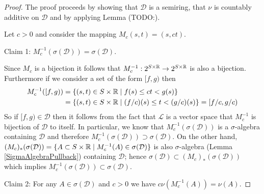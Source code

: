 \documentclass{amsart}
\theoremstyle{remark}
\theoremstyle{definition}
\begin{document}
\begin{proof}
The proof proceeds by showing that $\mathcal{D}$ is a semiring, that
$\nu$ is countably additive on $\mathcal{D}$ and by applying Lemma (TODO:).

Let $c > 0$ and consider the mapping $M_c(s,t) = (s, ct)$.  

Claim 1: $M_c^{-1}(\sigma(\mathcal{D})) = \sigma(\mathcal{D})$.

Since $M_c$ is a bijection it follows that $M_c^{-1} : 2^{S \times \mathbb{R}}
\to 2^{S \times \mathbb{R}}$ is also a bijection.  Furthermore if we
consider a set of the form $[f,g)$ then 
\begin{align*}
M_c^{-1}([f,g)) &= \lbrace (s,t) \in S \times \mathbb{R} \mid f(s) \leq ct
< g(s) \rbrace \\
&= \lbrace (s,t) \in S \times \mathbb{R} \mid (f/c)(s) \leq t
< (g/c)(s) \rbrace = [f/c, g/c)
\end{align*}
So if $[f,g) \in \mathcal{D}$ then it follows from the fact that
$\mathcal{L}$ is a vector space that $M_c^{-1}$ is bijection of
$\mathcal{D}$
to itself.  In particular, we know that $M_c^{-1}
(\sigma(\mathcal{D}))$ is a $\sigma$-algebra containing $\mathcal{D}$
  and therefore $M_c^{-1}
(\sigma(\mathcal{D})) \supset \sigma(\mathcal{D})$.  On the other
  hand, $(M_c)_*(\sigma(\mathcal{D})) = \lbrace A \subset S \times
  \mathbb{R} \mid M_c^{-1}(A) \in \sigma(\mathcal{D}) \rbrace$ is also
  $\sigma$-algebra (Lemma \ref{SigmaAlgebraPullback}) containing
  $\mathcal{D}$; hence $\sigma(\mathcal{D}) \subset
  (M_c)_*(\sigma(\mathcal{D}))$ which implies
  $M_c^{-1}(\sigma(\mathcal{D})) \subset \sigma(\mathcal{D})$.

Claim 2: For any $A \in \sigma(\mathcal{D})$ and $c > 0$ we have $c
\nu(M_c^{-1}(A)) = \nu(A)$.


\end{proof}
\end{document}
